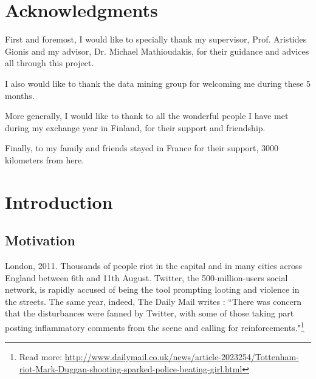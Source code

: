 \documentclass[a4paper,twoside,12pt,openright]{report}
\begin{document}
\newpage
\thispagestyle{empty}
\mbox{}



\chapter*{Acknowledgments}

First and foremost, I would like to specially thank my supervisor, Prof. Aristides Gionis and my advisor, Dr. Michael Mathioudakis, for their guidance and advices all through this project. 

I also would like to thank the data mining group for welcoming me during these 5 months.

More generally, I would like to thank to all the wonderful people I have met during my exchange year in Finland, for their support and friendship.

Finally, to my family and friends stayed in France for their support, 3000 kilometers from here.


\tableofcontents

\listoffigures




\restoregeometry

\chapter{Introduction}

\section{Motivation}

London, 2011. Thousands of people riot in the capital and in many cities across England between 6th and 11th August. Twitter, the 500-million-users social network, is rapidly accused of being the tool prompting looting and violence in the streets. The same year, indeed, The Daily Mail writes : ``There was concern that the disturbances were fanned by Twitter, with some of those taking part posting inflammatory comments from the scene and calling for reinforcements."\footnote{\noindent Read more: \url{http://www.dailymail.co.uk/news/article-2023254/Tottenham-riot-Mark-Duggan-shooting-sparked-police-beating-girl.html}}
\end{document}
